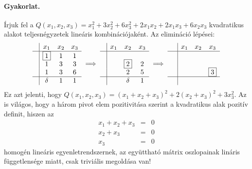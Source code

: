 \documentclass[a4paper, showtrims]{memoir}
\theoremstyle{plain}
\theoremstyle{remark}
\theoremstyle{definition}
\begin{document}
\paragraph{Gyakorlat.}
Írjuk fel a 
\(
Q\left( x_1,x_2,x_3 \right)=
x_1^2+3x_2^2+6x_3^2+
2x_1x_2+2x_1x_3+
6x_2x_3
\)
kvadratikus alakot teljesnégyzetek lineáris kombinációjaként.
Az elimináció lépései:
\[
\begin{array}{c|ccc}
     & x_1       & x_2 & x_3 \\
     \hline
     & \boxed{1} & 1   & 1   \\
     & 1         & 3   & 3   \\
     & 1         & 3   & 6   \\
    \hline
    & \delta     & 1   & 1
\end{array}
\implies
\begin{array}{c|ccc}
     & x_1& x_2  & x_3 \\
     \hline
     & &                &     \\
     & & \boxed{2}      & 2   \\
     & & 2              & 5   \\
     \hline
     & & \delta         & 1
\end{array}
\implies
\begin{array}{c|ccc}
     & x_1 & x_2 & x_3      \\
     \hline
     &     &     &          \\
     &     &     &          \\
     &     &     & \boxed{3}\\
    \hline
    \phantom{\delta}
\end{array}
\]
Ez azt jelenti, hogy 
\(
Q\left( x_1,x_2,x_3 \right)
=
\left( x_1+x_2+x_3 \right)^2
+2\left( x_2+x_3 \right)^2
+3x_3^2.
\)
Az is világos, hogy a három pivot elem pozitivitása szerint a kvadratikus alak pozitív definit,
hiszen az
\begin{eqnarray*}
    x_1+x_2+x_3&=& 0\\
    x_2+x_3&=& 0\\
    x_3&=& 0
\end{eqnarray*}
homogén lineáris egyenletrendszernek, 
az együttható mátrix oszlopainak lináris függetlensége miatt,
csak triviális megoldása van!
\end{document}

